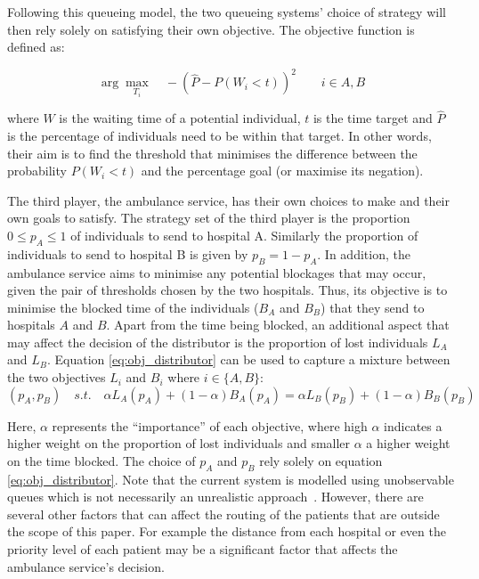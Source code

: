 Following this queueing model, the two queueing systems' choice of strategy will 
then rely solely on satisfying their own objective.
The objective function is defined as:

\begin{equation}\label{eq:obj_queueing_systems}
    \arg \max_{T_i} \quad -\left( \hat{P} - P(W_i < t) \right)^2 \qquad 
    i \in {A, B}
\end{equation}

where \(W\) is the waiting time of a potential individual, \(t\) is the time 
target and \(\hat{P}\) is the percentage of individuals need to be within that 
target. 
In other words, their aim is to find the threshold that minimises the 
difference between the probability \(P(W_i < t)\) and the percentage goal 
(or maximise its negation).

The third player, the ambulance service, has their own choices to make and 
their own 
goals to satisfy.
The strategy set of the third player is the proportion \(0 \leq p_A \leq 1\) of 
individuals to send to hospital A.
Similarly the proportion of individuals to send to hospital B is given by
\(p_B = 1 - p_A\).
In addition, the ambulance service aims to minimise any potential blockages
that may occur, given the pair of thresholds chosen by the two hospitals.
Thus, its objective is to minimise the blocked time of the individuals 
(\(B_A\) and \(B_B\))
that they send to hospitals \(A\) and \(B\).
Apart from the time being blocked, an additional aspect that may affect the 
decision of the distributor is the proportion of lost individuals 
\(L_A\) and \(L_B\).
Equation \ref{eq:obj_distributor} can be used to capture a mixture 
between the two objectives \(L_i\) and \(B_i\) where \(i \in \{A, B\}\):
\begin{equation}\label{eq:obj_distributor}
    (p_A, p_B) \quad s.t. \quad 
    \alpha L_A(p_A) + (1 - \alpha) B_A(p_A) = 
    \alpha L_B(p_B) + (1 - \alpha) B_B(p_B)
\end{equation}

Here, \(\alpha\) represents the ``importance'' of each objective,
where high \(\alpha\) indicates a higher weight on the proportion of lost 
individuals and smaller \(\alpha\) a higher weight on the time blocked. 
The choice of \(p_A\) and \(p_B\) rely solely on equation
\ref{eq:obj_distributor}.
Note that the current system is modelled using unobservable queues which is not
necessarily an unrealistic approach~\cite{unobservablequeue}.
However, there are several other factors that can affect the routing of the
patients that are outside the scope of this paper.
For example the distance from each hospital or even the priority level of each
patient may be a significant factor that affects the ambulance service's
decision.

